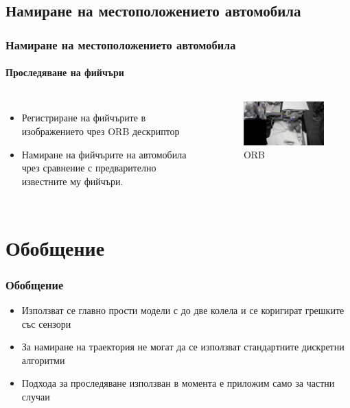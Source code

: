 \documentclass[hyperref=unicode]{beamer}
\begin{document}
    \subsection*{Намиране на местоположението автомобила}
    \begin{frame}
      \frametitle{Намиране на местоположението автомобила}
      \framesubtitle{Проследяване на фийчъри}
      \begin{columns}
      \begin{itemize}
        \item{Регистриране на фийчърите в изображението чрез ORB дескриптор}
        \item{Намиране на фийчърите на автомобила чрез сравнение с предварително известните му фийчъри.}
      \end{itemize}
      \begin{figure}
        \includegraphics[width=70mm]{ORBpicture.jpg}
        \caption{ORB}
        \label{fig:orb}
      \end{figure}
      \end{columns}
    \end{frame}
  \section{Обобщение}
    \begin{frame}
      \frametitle{Обобщение}
        \begin{itemize}
          \item{Използват се главно прости модели с до две колела и се коригират грешките със сензори}
          \item{За намиране на траектория не могат да се използват стандартните дискретни алгоритми}
          \item{Подхода за проследяване използван в момента е приложим само за частни случаи}
        \end{itemize}

    \end{frame}
\end{document}
